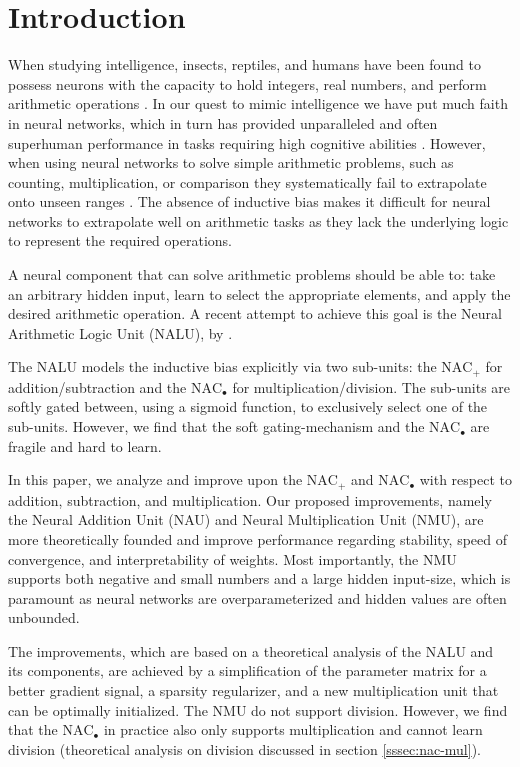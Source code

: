 \section{Introduction}
When studying intelligence, insects, reptiles, and humans have been found to possess neurons with the capacity to hold integers, real numbers, and perform arithmetic operations \cite{nieder-neuronal-number,rugani-arithmetic-chicks,gallistel-numbers-in-brain}.
In our quest to mimic intelligence we have put much faith in neural networks, which in turn has provided unparalleled and often superhuman performance in tasks requiring high cognitive abilities \cite{natureGo,bert,openai-learning-dexterous}.
However, when using neural networks to solve simple arithmetic problems, such as counting, multiplication, or comparison they systematically fail to extrapolate onto unseen ranges \cite{stillNotSystematic,suzgun2019evaluating,trask-nalu}.
The absence of inductive bias makes it difficult for neural networks to extrapolate well on arithmetic tasks as they lack the underlying logic to represent the required operations.

A neural component that can solve arithmetic problems should be able to: take an arbitrary hidden input, learn to select the appropriate elements, and apply the desired arithmetic operation.
A recent attempt to achieve this goal is the Neural Arithmetic Logic Unit (NALU), by \citet{trask-nalu}.

The NALU models the inductive bias explicitly via two sub-units: the $\text{NAC}_{+}$ for addition/subtraction and the $\text{NAC}_{\bullet}$ for multiplication/division.
The sub-units are softly gated between, using a sigmoid function, to exclusively select one of the sub-units.
However, we find that the soft gating-mechanism and the $\text{NAC}_{\bullet}$ are fragile and hard to learn.

In this paper, we analyze and improve upon the $\text{NAC}_{+}$ and $\text{NAC}_{\bullet}$ with respect to addition, subtraction, and multiplication.
Our proposed improvements, namely the Neural Addition Unit (NAU) and Neural Multiplication Unit (NMU), are more theoretically founded and improve performance regarding stability, speed of convergence, and interpretability of weights.
Most importantly, the NMU supports both negative and small numbers and a large hidden input-size, which is paramount as neural networks are overparameterized and hidden values are often unbounded.

The improvements, which are based on a theoretical analysis of the NALU and its components, are achieved by a simplification of the parameter matrix for a better gradient signal, a sparsity regularizer, and a new multiplication unit that can be optimally initialized.
The NMU do not support division.
However, we find that the $\text{NAC}_{\bullet}$ in practice also only supports multiplication and cannot learn division (theoretical analysis on division discussed in section \ref{sssec:nac-mul}).

